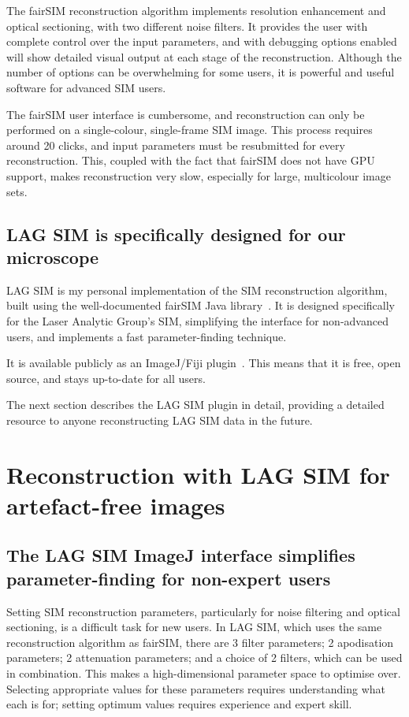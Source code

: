 The fairSIM reconstruction algorithm implements resolution enhancement and optical sectioning, with two different noise filters.
It provides the user with complete control over the input parameters, and with debugging options enabled will show detailed visual output at each stage of the reconstruction.
Although the number of options can be overwhelming for some users, it is powerful and useful software for advanced SIM users.

The fairSIM user interface is cumbersome, and reconstruction can only be performed on a single-colour, single-frame SIM image.
This process requires around 20 clicks, and input parameters must be resubmitted for every reconstruction.
This, coupled with the fact that fairSIM does not have GPU support, makes reconstruction very slow, especially for large, multicolour image sets.


\subsection{LAG SIM is specifically designed for our microscope}
LAG SIM is my personal implementation of the SIM reconstruction algorithm, built using the well-documented fairSIM Java library~\cite{fairsimGithub}.
It is designed specifically for the Laser Analytic Group's SIM, simplifying the interface for non-advanced users, and implements a fast parameter-finding technique.

It is available publicly as an ImageJ/Fiji plugin~\cite{lagsim}.
This means that it is free, open source, and stays up-to-date for all users.

The next section describes the LAG SIM plugin in detail, providing a detailed resource to anyone reconstructing LAG SIM data in the future.


\section{Reconstruction with LAG SIM for artefact-free images} \label{sec:lagsimFiji}

\subsection{The LAG SIM ImageJ interface simplifies parameter-finding for non-expert users}

Setting SIM reconstruction parameters, particularly for noise filtering and optical sectioning, is a difficult task for new users.
In LAG SIM, which uses the same reconstruction algorithm as fairSIM, there are 3 filter parameters; 2 apodisation parameters; 2 attenuation parameters; and a choice of 2 filters, which can be used in combination.
This makes a high-dimensional parameter space to optimise over.
Selecting appropriate values for these parameters requires understanding what each is for; setting optimum values requires experience and expert skill.

